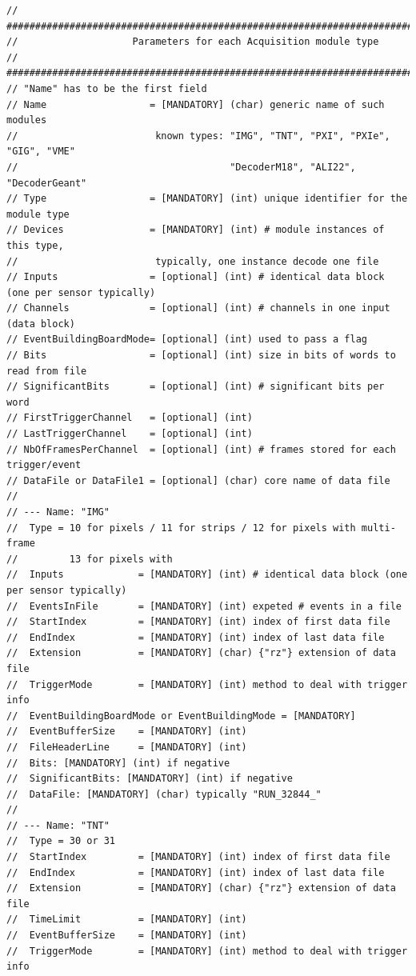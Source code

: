 \documentclass[a4paper, 12pt, twoside]{article}
\begin{document}
\begin{verbatim}
// #############################################################################
//                    Parameters for each Acquisition module type
// #############################################################################
// "Name" has to be the first field
// Name                  = [MANDATORY] (char) generic name of such modules
//                        known types: "IMG", "TNT", "PXI", "PXIe", "GIG", "VME"
//                                     "DecoderM18", "ALI22", "DecoderGeant"
// Type                  = [MANDATORY] (int) unique identifier for the module type
// Devices               = [MANDATORY] (int) # module instances of this type,
//                        typically, one instance decode one file
// Inputs                = [optional] (int) # identical data block (one per sensor typically) 
// Channels              = [optional] (int) # channels in one input (data block)
// EventBuildingBoardMode= [optional] (int) used to pass a flag
// Bits                  = [optional] (int) size in bits of words to read from file
// SignificantBits       = [optional] (int) # significant bits per word
// FirstTriggerChannel   = [optional] (int)  
// LastTriggerChannel    = [optional] (int) 
// NbOfFramesPerChannel  = [optional] (int) # frames stored for each trigger/event
// DataFile or DataFile1 = [optional] (char) core name of data file
//
// --- Name: "IMG"
//  Type = 10 for pixels / 11 for strips / 12 for pixels with multi-frame
//         13 for pixels with 
//  Inputs             = [MANDATORY] (int) # identical data block (one per sensor typically)
//  EventsInFile       = [MANDATORY] (int) expeted # events in a file
//  StartIndex         = [MANDATORY] (int) index of first data file
//  EndIndex           = [MANDATORY] (int) index of last data file
//  Extension          = [MANDATORY] (char) {"rz"} extension of data file
//  TriggerMode        = [MANDATORY] (int) method to deal with trigger info
//  EventBuildingBoardMode or EventBuildingMode = [MANDATORY]
//  EventBufferSize    = [MANDATORY] (int)
//  FileHeaderLine     = [MANDATORY] (int)
//  Bits: [MANDATORY] (int) if negative
//  SignificantBits: [MANDATORY] (int) if negative 
//  DataFile: [MANDATORY] (char) typically "RUN_32844_"
//
// --- Name: "TNT"
//  Type = 30 or 31
//  StartIndex         = [MANDATORY] (int) index of first data file
//  EndIndex           = [MANDATORY] (int) index of last data file
//  Extension          = [MANDATORY] (char) {"rz"} extension of data file
//  TimeLimit          = [MANDATORY] (int)
//  EventBufferSize    = [MANDATORY] (int)
//  TriggerMode        = [MANDATORY] (int) method to deal with trigger info

\end{verbatim}
\end{document}
